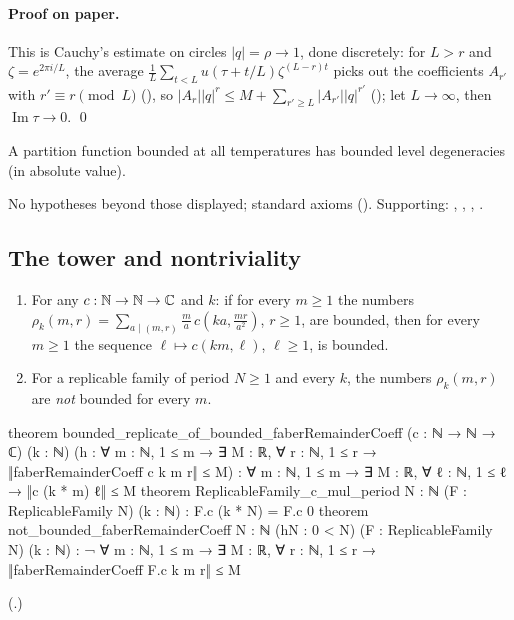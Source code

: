 \paragraph{Proof on paper.}  This is Cauchy's estimate on circles $|q|=\rho\to1$, done discretely: for $L>r$ and
$\zeta=e^{2\pi i/L}$, the average $\frac1L\sum_{t<L}u(\tau+t/L)\zeta^{(L-r)t}$ picks out the coefficients $A_{r'}$ with $r'\equiv r\pmod L$
(), so $|A_r||q|^r\le M+\sum_{r'\ge L}|A_{r'}||q|^{r'}$ (); let $L\to\infty$,
then $\operatorname{Im}\tau\to0$. \qed
\begin{physics}A partition function bounded at all temperatures has bounded level degeneracies (in absolute value).\end{physics}
\begin{status}No hypotheses beyond those displayed; standard axioms ().
Supporting: , , ,
.\end{status}

\subsection{The tower and nontriviality}

\begin{theorem}\label{ch19:thm:tower}
\begin{enumerate}[label=(\alph*)]
\item For any $c:{\mathbb{N}}\to{\mathbb{N}}\to{\mathbb{C}}$ and $k$: if for every $m\ge1$ the numbers $\rho_{k}(m,r)=\sum_{a\mid(m,r)}\frac ma\,c(ka,\frac{mr}{a^2})$,
  $r\ge1$, are bounded, then for every $m\ge1$ the sequence $\ell\mapsto c(km,\ell)$, $\ell\ge1$, is bounded.
\item For a replicable family of period $N\ge1$ and every $k$, the numbers $\rho_k(m,r)$ are \emph{not} bounded for every $m$.
\end{enumerate}
\end{theorem}
\begin{leancode}
theorem bounded_replicate_of_bounded_faberRemainderCoeff (c : ℕ → ℕ → ℂ) (k : ℕ)
    (h : ∀ m : ℕ, 1 ≤ m → ∃ M : ℝ, ∀ r : ℕ, 1 ≤ r → ‖faberRemainderCoeff c k m r‖ ≤ M) :
    ∀ m : ℕ, 1 ≤ m → ∃ M : ℝ, ∀ ℓ : ℕ, 1 ≤ ℓ → ‖c (k * m) ℓ‖ ≤ M
theorem ReplicableFamily_c_mul_period {N : ℕ} (F : ReplicableFamily N) (k : ℕ) :
    F.c (k * N) = F.c 0
theorem not_bounded_faberRemainderCoeff {N : ℕ} (hN : 0 < N) (F : ReplicableFamily N) (k : ℕ) :
    ¬ ∀ m : ℕ, 1 ≤ m → ∃ M : ℝ, ∀ r : ℕ, 1 ≤ r → ‖faberRemainderCoeff F.c k m r‖ ≤ M
\end{leancode}
(.)

